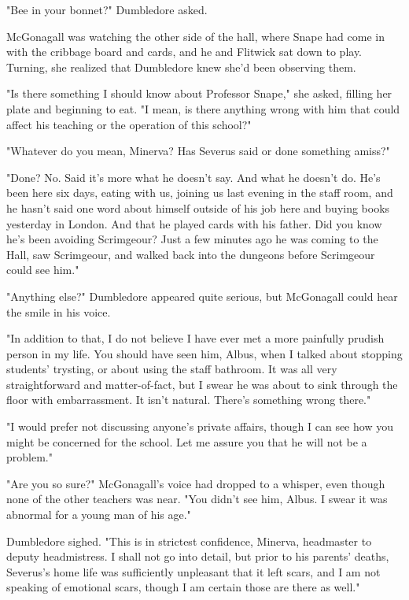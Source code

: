 "Bee in your bonnet?" Dumbledore asked.

McGonagall was watching the other side of the hall, where Snape had come in with the cribbage board and cards, and he and Flitwick sat down to play. Turning, she realized that Dumbledore knew she'd been observing them.

"Is there something I should know about Professor Snape," she asked, filling her plate and beginning to eat. "I mean, is there anything wrong with him that could affect his teaching or the operation of this school?"

"Whatever do you mean, Minerva? Has Severus said or done something amiss?"

"Done? No. Said{\el} it's more what he doesn't say. And what he doesn't do. He's been here six days, eating with us, joining us last evening in the staff room, and he hasn't said one word about himself outside of his job here and buying books yesterday in London. And that he played cards with his father. Did you know he's been avoiding Scrimgeour? Just a few minutes ago he was coming to the Hall, saw Scrimgeour, and walked back into the dungeons before Scrimgeour could see him."

"Anything else?" Dumbledore appeared quite serious, but McGonagall could hear the smile in his voice.

"In addition to that, I do not believe I have ever met a more painfully prudish person in my life. You should have seen him, Albus, when I talked about stopping students' trysting, or about using the staff bathroom. It was all very straightforward and matter-of-fact, but I swear he was about to sink through the floor with embarrassment. It isn't natural. There's something wrong there."

"I would prefer not discussing anyone's private affairs, though I can see how you might be concerned for the school. Let me assure you that he will not be a problem."

"Are you so sure?" McGonagall's voice had dropped to a whisper, even though none of the other teachers was near. "You didn't see him, Albus. I swear it was abnormal for a young man of his age."

Dumbledore sighed. "This is in strictest confidence, Minerva, headmaster to deputy headmistress. I shall not go into detail, but prior to his parents' deaths, Severus's home life was sufficiently unpleasant that it left scars, and I am not speaking of emotional scars, though I am certain those are there as well."

